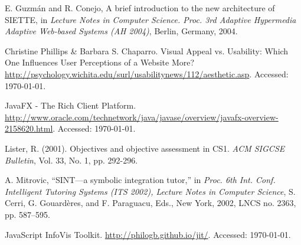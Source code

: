 \begin{thebibliography}{9}
 E. Guzmán and R. Conejo, A brief introduction to the new architecture of SIETTE, in \textit{Lecture Notes in Computer Science. Proc. 3rd Adaptive Hypermedia Adaptive Web-based Systems (AH 2004)}, Berlin, Germany,
2004.

 Christine Phillips \& Barbara S. Chaparro. Visual Appeal vs. Usability: Which One Influences User Perceptions of a Website More? \url{http://psychology.wichita.edu/surl/usabilitynews/112/aesthetic.asp}. Accessed: \today.

 JavaFX - The Rich Client Platform. \url{http://www.oracle.com/technetwork/java/javase/overview/javafx-overview-2158620.html}. Accessed: \today.

 Lister, R. (2001). Objectives and objective assessment in CS1. \textit{ACM SIGCSE Bulletin}, Vol. 33, No. 1, pp. 292-296.

 A. Mitrovic, “SINT—a symbolic integration tutor,” in \textit{Proc. 6th Int. Conf. Intelligent Tutoring Systems (ITS 2002), Lecture Notes in Computer
Science}, S. Cerri, G. Gouardères, and F. Paraguacu, Eds., New York, 2002, LNCS no. 2363, pp. 587–595.

 JavaScript InfoVis Toolkit. \url{http://philogb.github.io/jit/}. Accessed: \today.

\end{thebibliography}